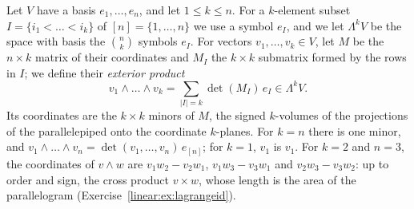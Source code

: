 Let $V$ have a basis $e_1,\dots,e_n$, and let $1\le k\le n$. For a $k$-element subset $I=\{i_1<\dots<i_k\}$ of
$[n]=\{1,\dots,n\}$ we use a symbol $e_I$, and we let $\Lambda^kV$ be the space with basis the $\binom nk$ symbols $e_I$.
For vectors $v_1,\dots,v_k\in V$, let $M$ be the $n\times k$ matrix of their coordinates and $M_I$ the $k\times k$
submatrix formed by the rows in $I$; we define their \emph{exterior product}
\[
v_1\wedge\dots\wedge v_k=\sum_{|I|=k}\det(M_I)\,e_I\in\Lambda^kV.
\]
Its coordinates are the $k\times k$ minors of $M$, the signed $k$-volumes of the projections of the parallelepiped onto
the coordinate $k$-planes. For $k=n$ there is one minor, and $v_1\wedge\dots\wedge v_n=\det(v_1,\dots,v_n)\,e_{[n]}$; for
$k=1$, $v_1$ is $v_1$. For $k=2$ and $n=3$, the coordinates of $v\wedge w$ are $v_1w_2-v_2w_1$, $v_1w_3-v_3w_1$ and
$v_2w_3-v_3w_2$: up to order and sign, the cross product $v\times w$, whose length is the area of the parallelogram
(Exercise~\ref{linear:ex:lagrangeid}).

